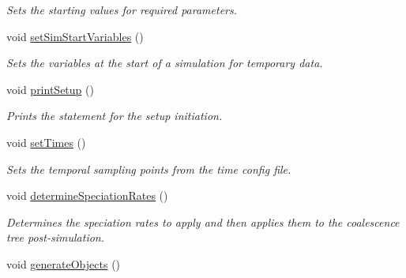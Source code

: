 \begin{DoxyCompactItemize}
\begin{DoxyCompactList}\small\item\em Sets the starting values for required parameters. \end{DoxyCompactList}\item 
void \hyperlink{class_tree_a1ba0f5d27c6ef6e9e17f988aff2dfe65}{set\+Sim\+Start\+Variables} ()
\begin{DoxyCompactList}\small\item\em Sets the variables at the start of a simulation for temporary data. \end{DoxyCompactList}\item 
void \hyperlink{class_tree_ab71da7797a6586ddd948661c34ce4788}{print\+Setup} ()
\begin{DoxyCompactList}\small\item\em Prints the statement for the setup initiation. \end{DoxyCompactList}\item 
void \hyperlink{class_tree_ae3fb33c46cf7e3af44604a9875b375a3}{set\+Times} ()\hypertarget{class_tree_ae3fb33c46cf7e3af44604a9875b375a3}{}\label{class_tree_ae3fb33c46cf7e3af44604a9875b375a3}

\begin{DoxyCompactList}\small\item\em Sets the temporal sampling points from the time config file. \end{DoxyCompactList}\item 
void \hyperlink{class_tree_a25f082da13789dfa3fefcbcfd08b4dfe}{determine\+Speciation\+Rates} ()
\begin{DoxyCompactList}\small\item\em Determines the speciation rates to apply and then applies them to the coalescence tree post-\/simulation. \end{DoxyCompactList}\item 
void \hyperlink{class_tree_a50b3d13d4032e0d7a69890b9bd7f84fa}{generate\+Objects} ()\hypertarget{class_tree_a50b3d13d4032e0d7a69890b9bd7f84fa}{}\label{class_tree_a50b3d13d4032e0d7a69890b9bd7f84fa}


\end{DoxyCompactItemize}
